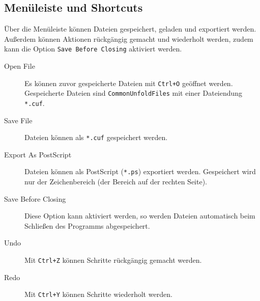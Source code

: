 \subsection{Menüleiste und Shortcuts}
\label{subsec:dateioperationen}

Über die Menüleiste können Dateien gespeichert, geladen und exportiert werden. Außerdem können Aktionen rückgängig gemacht und wiederholt werden, zudem kann die Option \texttt{Save Before Closing} aktiviert werden.

\begin{description}
  \item [Open File] Es können zuvor gespeicherte Dateien mit \texttt{Ctrl+O} geöffnet werden. Gespeicherte Dateien sind \texttt{CommonUnfoldFiles} mit einer Dateiendung \texttt{*.cuf}.
  \item [Save File] Dateien können als \texttt{*.cuf} gespeichert werden.
  \item [Export As PostScript] Dateien können als PostScript (\texttt{*.ps}) exportiert werden. Gespeichert wird nur der Zeichenbereich (der Bereich auf der rechten Seite).
  \item [Save Before Closing] Diese Option kann aktiviert werden, so werden Dateien automatisch beim Schließen des Programms abgespeichert.
  \item [Undo] Mit \texttt{Ctrl+Z} können Schritte rückgängig gemacht werden.
  \item [Redo] Mit \texttt{Ctrl+Y} können Schritte wiederholt werden. 
\end{description}